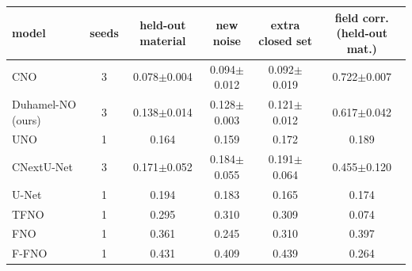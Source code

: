 \begin{tabular}{lccccc}
\toprule
model & seeds & held-out material & new noise & extra closed set & field corr. (held-out mat.) \\
\midrule
CNO & 3 & 0.078{\scriptsize$\pm$0.004} & 0.094{\scriptsize$\pm$0.012} & 0.092{\scriptsize$\pm$0.019} & 0.722{\scriptsize$\pm$0.007} \\
Duhamel-NO (ours) & 3 & 0.138{\scriptsize$\pm$0.014} & 0.128{\scriptsize$\pm$0.003} & 0.121{\scriptsize$\pm$0.012} & 0.617{\scriptsize$\pm$0.042} \\
UNO & 1 & 0.164 & 0.159 & 0.172 & 0.189 \\
CNextU-Net & 3 & 0.171{\scriptsize$\pm$0.052} & 0.184{\scriptsize$\pm$0.055} & 0.191{\scriptsize$\pm$0.064} & 0.455{\scriptsize$\pm$0.120} \\
U-Net & 1 & 0.194 & 0.183 & 0.165 & 0.174 \\
TFNO & 1 & 0.295 & 0.310 & 0.309 & 0.074 \\
FNO & 1 & 0.361 & 0.245 & 0.310 & 0.397 \\
F-FNO & 1 & 0.431 & 0.409 & 0.439 & 0.264 \\
\bottomrule
\end{tabular}